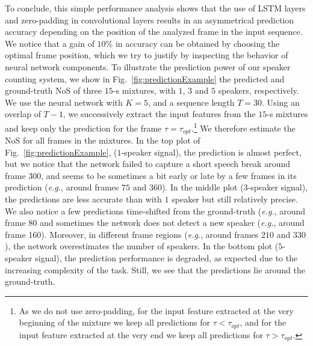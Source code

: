 To conclude, this simple performance analysis shows that the use of LSTM layers and zero-padding in convolutional layers results in an asymmetrical prediction accuracy depending on the position of the analyzed frame in the input sequence. We notice that a gain of $10$\% in accuracy can be obtained by choosing the optimal frame position, which we try to justify by inspecting the behavior of neural network components. To illustrate the prediction power of our speaker counting system, we show in Fig.~\ref{fig:predictionExample} the predicted and ground-truth NoS of three $15$-s mixtures, with $1$, $3$ and $5$ speakers, respectively. We use the neural network with $K = 5$, and a sequence length $T=30$. Using an overlap of $T-1$, we successively extract the input features from the $15$-s mixtures and keep only the prediction for the frame $\tau = \tau_{opt}$.\footnote{As we do not use zero-padding, for the input feature extracted at the very beginning of the mixture we keep all predictions for $\tau < \tau_{opt}$, and for the input feature extracted at the very end we keep all predictions for $\tau > \tau_{opt}$.} We therefore estimate the NoS for all frames in the mixtures. In the top plot of Fig.~\ref{fig:predictionExample}, ($1$-speaker signal), the prediction is almost perfect, but we notice that the network failed to capture a short speech break around frame $300$, and seems to be sometimes a bit early or late by a few frames in its prediction (\emph{e.g.}, around frames $75$ and $360$). In the middle plot ($3$-speaker signal), the predictions are less accurate than with $1$ speaker but still relatively precise. We also notice a few predictions time-shifted from the ground-truth (\emph{e.g.}, around frame $80$ and sometimes the network does not detect a new speaker (\emph{e.g.}, around frame 160). Moreover, in different frame regions (\emph{e.g.}, around frames $210$ and $330$), the network overestimates the number of speakers. In the bottom plot ($5$-speaker signal), the prediction performance is degraded, as expected due to the increasing complexity of the task. Still, we see that the predictions lie around the ground-truth.

